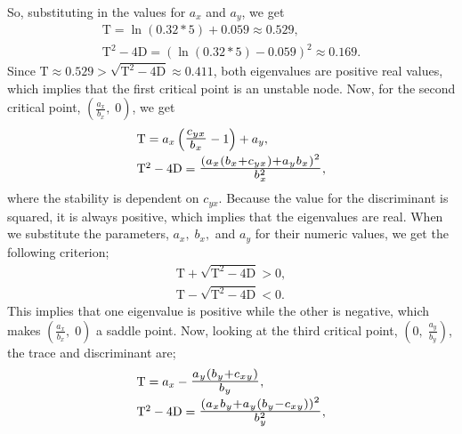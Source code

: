 So, substituting in the values for $a_x$ and $a_y$, we get
\begin{equation*}
    \begin{array}{l}
         \mathrm{T} = \ln(0.32*5) + 0.059 \approx 0.529,  \\
         \mathrm{T}^2-4\mathrm{D} = (\ln(0.32*5)-0.059)^2 \approx 0.169.
    \end{array}
\end{equation*}
Since $\mathrm{T}\approx 0.529 > \sqrt{\mathrm{T}^2-4\mathrm{D}} \approx 0.411$, both eigenvalues are positive real values, which implies that the first critical point is an unstable node. Now, for the second critical point, $\displaystyle\left(\frac{a_x}{b_x},\;0\right)$, we get
\begin{equation*}
    \begin{array}{l}
        \mathrm{T}= a_x \left(\scalebox{1.3}{$\frac{c_{yx}}{b_x}$}-1\right)+a_y, \\[.2cm]
        \mathrm{T}^2 - 4\mathrm{D}= \scalebox{1.3}{$\frac{(a_x (b_x+c_{yx})+a_y b_x)^2}{b_x^2}$},
    \end{array}
\end{equation*}
where the stability is dependent on $c_{yx}$.
Because the value for the discriminant is squared, it is always positive, which implies that the eigenvalues are real.
When we substitute the parameters, $a_x,\;b_x,$ and $a_y$ for their numeric values, we get the following criterion;
\begin{equation*}
    \begin{array}{l}
        \mathrm{T}+\sqrt{\mathrm{T}^2-4\mathrm{D}}>0,  \\
         \mathrm{T}-\sqrt{\mathrm{T}^2-4\mathrm{D}}<0.
    \end{array}
\end{equation*}
This implies that one eigenvalue is positive while the other is negative, which makes $\displaystyle\left(\frac{a_x}{b_x},\;0\right)$ a saddle point.
Now, looking at the third critical point, $\displaystyle\left(0,\;\frac{a_y}{b_y}\right)$, the trace and discriminant are;
\begin{equation*}
    \begin{array}{l}
        \mathrm{T}= a_x-\scalebox{1.3}{$\frac{a_y (b_y+c_{xy})}{b_y}$}, \\[.2cm]
        \mathrm{T}^2 - 4\mathrm{D}= \scalebox{1.3}{$\frac{(a_x b_y+a_y (b_y-c_{xy}))^2}{b_y^2}$},
    \end{array}
\end{equation*}
